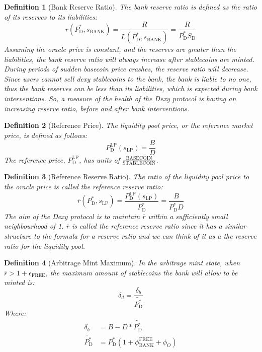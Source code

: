 \documentclass{ifcolog}
\newcommand{\Pdt}{P_{\mathrm{D}}^{*}}
\newcommand{\Plp}{P_{\mathrm{D}}^{\mathrm{LP}}}
\newcommand{\Sd}{S_{\mathrm{D}}}
\newcommand{\rr}{\bar{r}}
\newcommand{\sbank}{s_{\textrm{BANK}}}
\newcommand{\slp}{s_{\mathrm{LP}}}
\newcommand{\epsilonfree}{\epsilon_{\textrm{FREE}}}
\newcommand{\dx}{Dexy}
\newtheorem{definition}{Definition}
\begin{document}
\begin{definition}[Bank Reserve Ratio]
  The bank reserve ratio is defined as the ratio of its reserves to its liabilities:
  \begin{equation}
    r(\Pdt, \sbank) = \frac{R}{L(\Pdt, \sbank)} = \frac{R}{\Pdt \Sd}
  \end{equation}
  Assuming the oracle price is constant, and the reserves are greater than the liabilities,
  the bank reserve ratio will always increase after stablecoins are minted. 
  During periods of sudden basecoin price crashes, the reserve ratio will decrease. 
  Since users cannot sell dexy stablecoins to the bank, the bank is liable to no one, 
  thus the bank reserves can be less than its liabilities, which is expected during bank interventions.
  So, a measure of the health of the \dx{} protocol is having an increasing reserve ratio, 
  before and after bank interventions.
 
\end{definition}

\begin{definition}[Reference Price]
  The liquidity pool price, or the reference market price, is defined as follows:
  \begin{equation}
    \Plp(\slp) = \frac{B}{D}
  \end{equation}
  The reference price, $\Plp$, has units of $\frac{\textrm{BASECOIN}}{\textrm{STABLECOIN}}$.
\end{definition}

\begin{definition}[Reference Reserve Ratio]
    The ratio of the liquidity pool price to the oracle price is called the reference reserve ratio:
\begin{equation}
  \label{eq:r}
  \bar{r}(\Pdt, \slp) = \frac{\Plp(\slp)}{\Pdt} = \frac{B}{\Pdt D}
\end{equation}
  The aim of the \dx{} protocol is to maintain $\rr$ within a sufficiently small neighbourhood of 1.
  $\rr$ is called the reference reserve ratio since it has a similar structure to the formula for a reserve ratio and 
  we can think of it as a the reserve ratio for the liquidity pool.
\end{definition}

\begin{definition}[Arbitrage Mint Maximum]
  In the arbitrage mint state, when $\rr > 1 + \epsilonfree$, the maximum amount of stablecoins the bank 
  will allow to be minted is:
\begin{equation}
  \delta_{d} = \frac{\delta_b}{\tilde{\Pdt}}
\end{equation}
  Where:
\begin{align}
  \delta_b &= B - D * \tilde{\Pdt} \\
  \tilde{\Pdt} &= \Pdt(1 + \phi_{\textrm{BANK}}^{\textrm{FREE}} + \phi_{O})
\end{align}
\end{definition}
\end{document}

